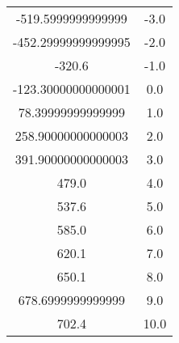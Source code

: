 \begin{table}
\begin{tabular}{S[]S[]}
-519.5999999999999 & -3.0\\
-452.29999999999995 & -2.0\\
-320.6 & -1.0\\
-123.30000000000001 & 0.0\\
78.39999999999999 & 1.0\\
258.90000000000003 & 2.0\\
391.90000000000003 & 3.0\\
479.0 & 4.0\\
537.6 & 5.0\\
585.0 & 6.0\\
620.1 & 7.0\\
650.1 & 8.0\\
678.6999999999999 & 9.0\\
702.4 & 10.0\\
\bottomrule
\end{tabular}\end{table}